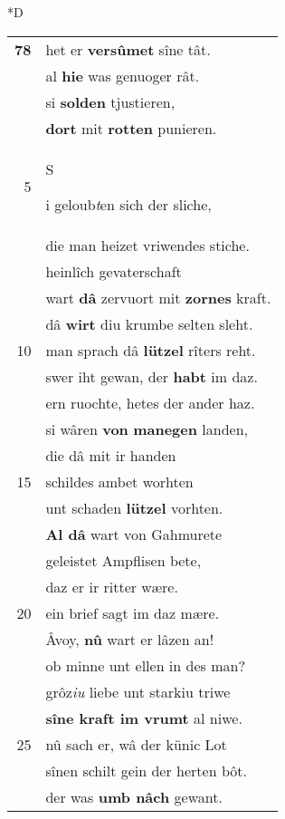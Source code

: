\documentclass[8pt,a4paper,notitlepage]{article}
\begin{document}
\begin{table}[ht]
\begin{minipage}[t]{0.5\linewidth}
\small
\begin{center}*D
\end{center}
\begin{tabular}{rl}
\textbf{78} & het er \textbf{versûmet} sîne tât.\\ 
 & al \textbf{hie} was genuoger rât.\\ 
 & si \textbf{solden} tjustieren,\\ 
 & \textbf{dort} mit \textbf{rotten} punieren.\\ 
5 & \begin{large}S\end{large}i geloub\textit{t}en sich der sliche,\\ 
 & die man heizet vriwendes stiche.\\ 
 & heinlîch gevaterschaft\\ 
 & wart \textbf{dâ} zervuort mit \textbf{zornes} kraft.\\ 
 & dâ \textbf{wirt} diu krumbe selten sleht.\\ 
10 & man sprach dâ \textbf{lützel} rîters reht.\\ 
 & swer iht gewan, der \textbf{habt} im daz.\\ 
 & ern ruochte, hetes der ander haz.\\ 
 & si wâren \textbf{von} \textbf{manegen} landen,\\ 
 & die dâ mit ir handen\\ 
15 & schildes ambet worhten\\ 
 & unt schaden \textbf{lützel} vorhten.\\ 
 & \textbf{Al dâ} wart von Gahmurete\\ 
 & geleistet Ampflisen bete,\\ 
 & daz er ir ritter wære.\\ 
20 & ein brief sagt im daz mære.\\ 
 & Âvoy, \textbf{nû} wart er lâzen an!\\ 
 & ob minne unt ellen in des man?\\ 
 & grôz\textit{iu} liebe unt starkiu triwe\\ 
 & \textbf{sîne kraft im vrumt} al niwe.\\ 
25 & nû sach er, wâ der künic Lot\\ 
 & sînen schilt gein der herten bôt.\\ 
 & der was \textbf{umb nâch} gewant.\\ 

\end{tabular}
\end{minipage}
\end{table}
\end{document}
